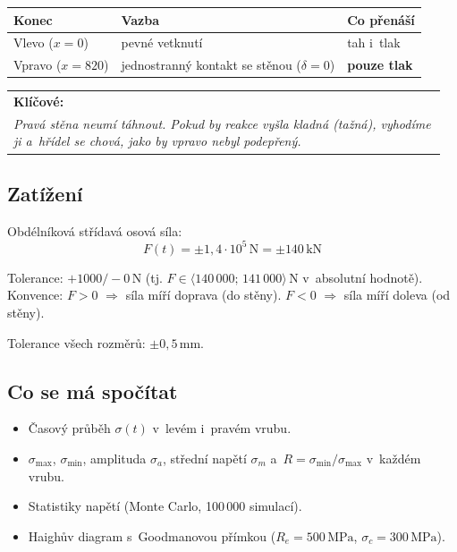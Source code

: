 \documentclass[a4paper,11pt]{article}
\makeatletter
\newcommand{\unit}[1]{\,\mathrm{#1}}
\newcommand{\E}[1]{\cdot 10^{#1}}
\newenvironment{poznamka}[1][Poznámka]{%
    \par\medskip\noindent\begin{tabular}{@{}|p{0.96\linewidth}@{}}\hline
    \textbf{#1:}\\[-0.4ex]\itshape\ignorespaces}{%
    \\\hline\end{tabular}\par\medskip}
\makeatother
\begin{document}
\begin{table}[H]
\centering
\begin{tabular}{lll}
\toprule
\textbf{Konec} & \textbf{Vazba} & \textbf{Co přenáší} \\
\midrule
Vlevo ($x=0$)   & pevné vetknutí & tah i~tlak \\
Vpravo ($x=820$) & jednostranný kontakt se stěnou ($\delta=0$) & \textbf{pouze tlak} \\
\bottomrule
\end{tabular}
\end{table}

\begin{poznamka}[Klíčové]
Pravá stěna neumí táhnout. Pokud by reakce vyšla kladná (tažná), vyhodíme ji a~hřídel se chová, jako by vpravo nebyl podepřený.
\end{poznamka}

\subsection{Zatížení}

Obdélníková střídavá osová síla:
\begin{equation}
F(t) = \pm 1{,}4\E{5}\unit{N} = \pm 140\unit{kN}
\end{equation}

Tolerance: $+1000 / -0\unit{N}$ (tj. $F \in \langle 140\,000;\,141\,000\rangle\unit{N}$ v~absolutní hodnotě). Konvence: $F > 0$ $\Rightarrow$ síla míří doprava (do stěny). $F < 0$ $\Rightarrow$ síla míří doleva (od stěny).

Tolerance všech rozměrů: $\pm 0{,}5\unit{mm}$.

\subsection{Co se má spočítat}

\begin{itemize}[nosep]
    \item Časový průběh $\sigma(t)$ v~levém i~pravém vrubu.
    \item $\sigma_{\max}$, $\sigma_{\min}$, amplituda $\sigma_a$, střední napětí $\sigma_m$ a~$R = \sigma_{\min}/\sigma_{\max}$ v~každém vrubu.
    \item Statistiky napětí (Monte Carlo, 100\,000 simulací).
    \item Haighův diagram s~Goodmanovou přímkou ($R_e = 500\unit{MPa}$, $\sigma_c = 300\unit{MPa}$).
\end{itemize}
\end{document}
